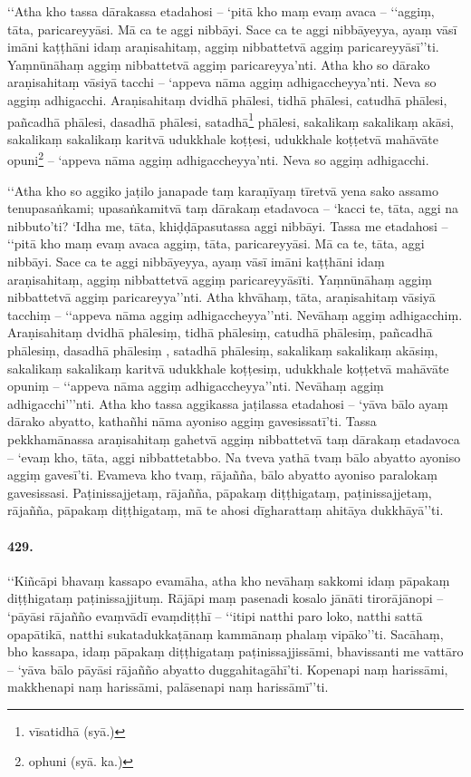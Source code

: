 ‘‘Atha kho tassa dārakassa etadahosi – ‘pitā kho maṃ evaṃ avaca – ‘‘aggiṃ, tāta, paricareyyāsi. Mā ca te aggi nibbāyi. Sace ca te aggi nibbāyeyya, ayaṃ vāsī imāni kaṭṭhāni idaṃ araṇisahitaṃ, aggiṃ nibbattetvā aggiṃ paricareyyāsī’’ti. Yaṃnūnāhaṃ aggiṃ nibbattetvā aggiṃ paricareyya’nti. Atha kho so dārako araṇisahitaṃ vāsiyā tacchi – ‘appeva nāma aggiṃ adhigaccheyya’nti. Neva so aggiṃ adhigacchi. Araṇisahitaṃ dvidhā phālesi, tidhā phālesi, catudhā phālesi, pañcadhā phālesi, dasadhā phālesi, satadhā\footnote{vīsatidhā (syā.)} phālesi, sakalikaṃ sakalikaṃ akāsi, sakalikaṃ sakalikaṃ karitvā udukkhale koṭṭesi, udukkhale koṭṭetvā mahāvāte opuni\footnote{ophuni (syā. ka.)} – ‘appeva nāma aggiṃ adhigaccheyya’nti. Neva so aggiṃ adhigacchi.

‘‘Atha kho so aggiko jaṭilo janapade taṃ karaṇīyaṃ tīretvā yena sako assamo tenupasaṅkami; upasaṅkamitvā taṃ dārakaṃ etadavoca – ‘kacci te, tāta, aggi na nibbuto’ti? ‘Idha me, tāta, khiḍḍāpasutassa aggi nibbāyi. Tassa me etadahosi – ‘‘pitā kho maṃ evaṃ avaca aggiṃ, tāta, paricareyyāsi. Mā ca te, tāta, aggi nibbāyi. Sace ca te aggi nibbāyeyya, ayaṃ vāsī imāni kaṭṭhāni idaṃ araṇisahitaṃ, aggiṃ nibbattetvā aggiṃ paricareyyāsīti. Yaṃnūnāhaṃ aggiṃ nibbattetvā aggiṃ paricareyya’’nti. Atha khvāhaṃ, tāta, araṇisahitaṃ vāsiyā tacchiṃ – ‘‘appeva nāma aggiṃ adhigaccheyya’’nti. Nevāhaṃ aggiṃ adhigacchiṃ. Araṇisahitaṃ dvidhā phālesiṃ, tidhā phālesiṃ, catudhā phālesiṃ, pañcadhā phālesiṃ, dasadhā phālesiṃ , satadhā phālesiṃ, sakalikaṃ sakalikaṃ akāsiṃ, sakalikaṃ sakalikaṃ karitvā udukkhale koṭṭesiṃ, udukkhale koṭṭetvā mahāvāte opuniṃ – ‘‘appeva nāma aggiṃ adhigaccheyya’’nti. Nevāhaṃ aggiṃ adhigacchi’’’nti. Atha kho tassa aggikassa jaṭilassa etadahosi – ‘yāva bālo ayaṃ dārako abyatto, kathañhi nāma ayoniso aggiṃ gavesissatī’ti. Tassa pekkhamānassa araṇisahitaṃ gahetvā aggiṃ nibbattetvā taṃ dārakaṃ etadavoca – ‘evaṃ kho, tāta, aggi nibbattetabbo. Na tveva yathā tvaṃ bālo abyatto ayoniso aggiṃ gavesī’ti. Evameva kho tvaṃ, rājañña, bālo abyatto ayoniso paralokaṃ gavesissasi. Paṭinissajjetaṃ, rājañña, pāpakaṃ diṭṭhigataṃ, paṭinissajjetaṃ, rājañña, pāpakaṃ diṭṭhigataṃ, mā te ahosi dīgharattaṃ ahitāya dukkhāyā’’ti.

\paragraph{429.} ‘‘Kiñcāpi bhavaṃ kassapo evamāha, atha kho nevāhaṃ sakkomi idaṃ pāpakaṃ diṭṭhigataṃ paṭinissajjituṃ. Rājāpi maṃ pasenadi kosalo jānāti tirorājānopi – ‘pāyāsi rājañño evaṃvādī evaṃdiṭṭhī – ‘‘itipi natthi paro loko, natthi sattā opapātikā, natthi sukatadukkaṭānaṃ kammānaṃ phalaṃ vipāko’’ti. Sacāhaṃ, bho kassapa, idaṃ pāpakaṃ diṭṭhigataṃ paṭinissajjissāmi, bhavissanti me vattāro – ‘yāva bālo pāyāsi rājañño abyatto duggahitagāhī’ti. Kopenapi naṃ harissāmi, makkhenapi naṃ harissāmi, palāsenapi naṃ harissāmī’’ti.

